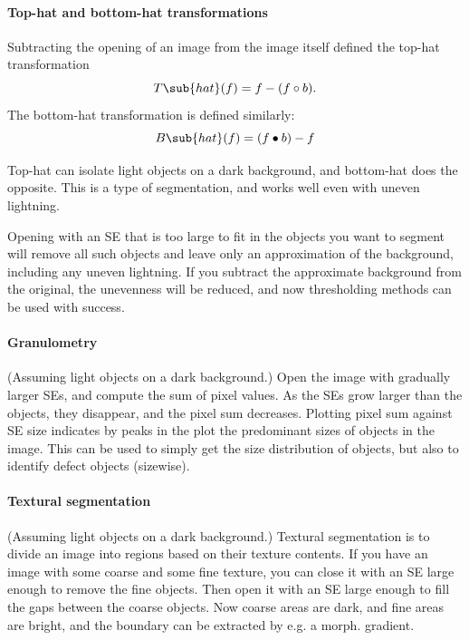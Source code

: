 \paragraph{Top-hat and bottom-hat transformations}\label{par:top-hat}
Subtracting the opening of an image from the image itself defined the top-hat transformation
\begin{equation}
    T\sub{hat}(f) = f - (f \open b).
\end{equation}
The bottom-hat transformation is defined similarly:
\begin{equation}
    B\sub{hat}(f) = (f \close b) - f
\end{equation}

Top-hat can isolate light objects on a dark background, and bottom-hat does the opposite. This is a type of segmentation, and works well even with uneven lightning.

Opening with an SE that is too large to fit in the objects you want to segment will remove all such objects and leave only an approximation of the background, including any uneven lightning. If you subtract the approximate background from the original, the unevenness will be reduced, and now thresholding methods can be used with success.

\paragraph{Granulometry}
(Assuming light objects on a dark background.) Open the image with gradually larger SEs, and compute the sum of pixel values. As the SEs grow larger than the objects, they disappear, and the pixel sum decreases. Plotting pixel sum against SE size indicates by peaks in the plot the predominant sizes of objects in the image. This can be used to simply get the size distribution of objects, but also to identify defect objects (sizewise).

\paragraph{Textural segmentation}
(Assuming light objects on a dark background.) Textural segmentation is to divide an image into regions based on their texture contents. If you have an image with some coarse and some fine texture, you can close it with an SE large enough to remove the fine objects. Then open it with an SE large enough to fill the gaps between the coarse objects. Now coarse areas are dark, and fine areas are bright, and the boundary can be extracted by e.g. a morph. gradient.


